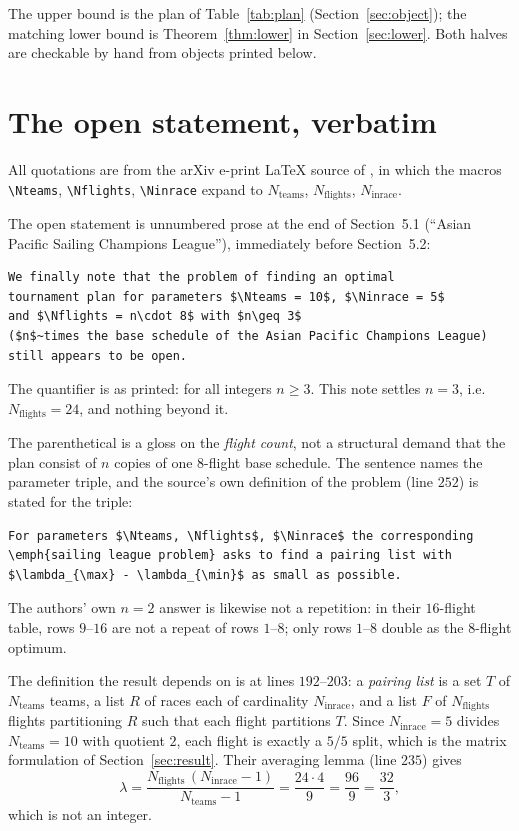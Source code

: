 \documentclass[11pt]{amsart}
\theoremstyle{remark}
\begin{document}
The upper bound is the plan of Table~\ref{tab:plan}
(Section~\ref{sec:object}); the matching lower bound is
Theorem~\ref{thm:lower} in Section~\ref{sec:lower}. Both halves are
checkable by hand from objects printed below.

\section{The open statement, verbatim}\label{sec:source}

All quotations are from the arXiv e-print \LaTeX{} source of
\cite{SchuelerSchuermann}, in which the macros \verb|\Nteams|,
\verb|\Nflights|, \verb|\Ninrace| expand to $N_{\mathrm{teams}}$,
$N_{\mathrm{flights}}$, $N_{\mathrm{inrace}}$.

The open statement is unnumbered prose at the end of Section~5.1 (``Asian
Pacific Sailing Champions League''), immediately before Section~5.2:
\begingroup\footnotesize
\begin{verbatim}
We finally note that the problem of finding an optimal
tournament plan for parameters $\Nteams = 10$, $\Ninrace = 5$
and $\Nflights = n\cdot 8$ with $n\geq 3$
($n$~times the base schedule of the Asian Pacific Champions League)
still appears to be open.
\end{verbatim}
\endgroup
The quantifier is as printed: for all integers $n\ge3$. This note settles
$n=3$, i.e. $N_{\mathrm{flights}}=24$, and nothing beyond it.

The parenthetical is a gloss on the \emph{flight count}, not a structural
demand that the plan consist of $n$ copies of one $8$-flight base schedule. The
sentence names the parameter triple, and the source's own definition of the
problem (line $252$) is stated for the triple:
\begingroup\footnotesize
\begin{verbatim}
For parameters $\Nteams, \Nflights$, $\Ninrace$ the corresponding
\emph{sailing league problem} asks to find a pairing list with
$\lambda_{\max} - \lambda_{\min}$ as small as possible.
\end{verbatim}
\endgroup
\noindent The authors' own $n=2$ answer is likewise not a repetition: in their
$16$-flight table, rows $9$--$16$ are not a repeat of rows $1$--$8$; only rows
$1$--$8$ double as the $8$-flight optimum.

The definition the result depends on is at lines $192$--$203$: a
\emph{pairing list} is a set $T$ of $N_{\mathrm{teams}}$ teams, a list $R$ of
races each of cardinality $N_{\mathrm{inrace}}$, and a list $F$ of
$N_{\mathrm{flights}}$ flights partitioning $R$ such that each flight
partitions $T$. Since $N_{\mathrm{inrace}}=5$ divides $N_{\mathrm{teams}}=10$
with quotient $2$, each flight is exactly a $5/5$ split, which is the matrix
formulation of Section~\ref{sec:result}. Their averaging lemma (line $235$)
gives
\begin{equation}\label{eq:avg}
  \lambda
  =\frac{N_{\mathrm{flights}}\,(N_{\mathrm{inrace}}-1)}{N_{\mathrm{teams}}-1}
  =\frac{24\cdot4}{9}=\frac{96}{9}=\frac{32}{3},
\end{equation}
which is not an integer.
\end{document}
